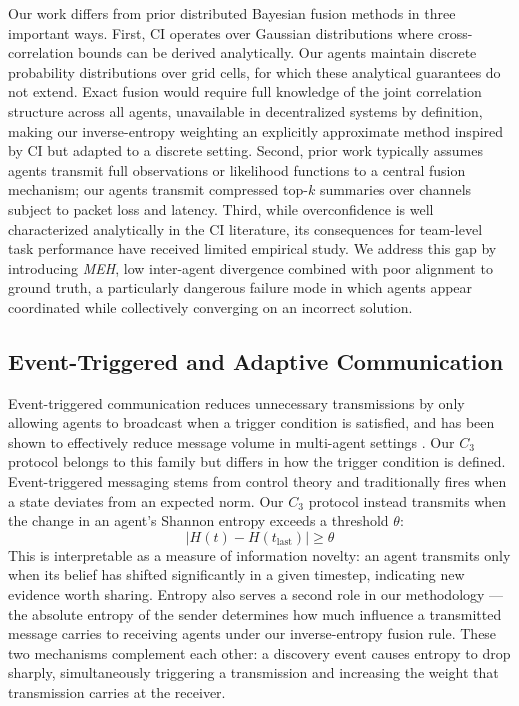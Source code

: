 \documentclass[pdflatex,sn-mathphys-num]{sn-jnl}%
\theoremstyle{thmstyleone}%
\theoremstyle{thmstyletwo}%
\theoremstyle{thmstylethree}%
\begin{document}
Our work differs from prior distributed Bayesian fusion methods in three important ways. First, CI operates over Gaussian distributions where cross-correlation bounds can be derived analytically. Our agents maintain discrete probability distributions over grid cells, for which these analytical guarantees do not extend. Exact fusion would require full knowledge of the joint correlation structure across all agents,
unavailable in decentralized systems by definition, making our 
inverse-entropy weighting an explicitly approximate method inspired by CI but adapted to a discrete setting. Second, prior work typically assumes agents transmit full observations or likelihood functions to a central fusion mechanism; our agents transmit compressed top-$k$ summaries over channels subject to packet loss and latency. Third, while overconfidence is well characterized analytically in the CI literature, its consequences for team-level task performance have received limited empirical study. We address this gap by introducing \emph{MEH}, low inter-agent divergence combined with poor alignment to ground truth, a particularly dangerous failure mode in which agents appear coordinated while collectively converging on an incorrect solution.

\subsection{Event-Triggered and Adaptive Communication}

Event-triggered communication reduces unnecessary transmissions by 
only allowing agents to broadcast when a trigger condition is 
satisfied, and has been shown to effectively reduce message volume 
in multi-agent settings \cite{nowzari2019event}. Our $C_3$ protocol 
belongs to this family but differs in how the trigger condition is 
defined. Event-triggered messaging stems from control theory and 
traditionally fires when a state deviates from an expected norm. 
Our $C_3$ protocol instead transmits when the change in an agent's 
Shannon entropy exceeds a threshold $\theta$:
%
\begin{equation}
    |H(t) - H(t_{\text{last}})| \geq \theta
\end{equation}
%
This is interpretable as a measure of information novelty: an agent 
transmits only when its belief has shifted significantly in a given timestep, indicating 
new evidence worth sharing. Entropy also serves a second role in our 
methodology --- the absolute entropy of the sender determines how 
much influence a transmitted message carries to receiving agents 
under our inverse-entropy fusion rule. These two mechanisms 
complement each other: a discovery event causes entropy to drop 
sharply, simultaneously triggering a transmission and increasing 
the weight that transmission carries at the receiver.
\end{document}
